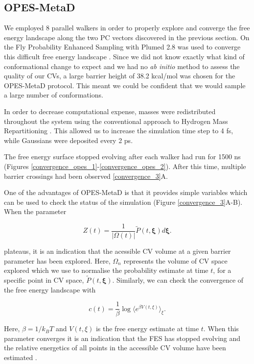 \subsection{OPES-MetaD}
We employed 8 parallel walkers in order to properly explore and converge the free energy landscape along the two PC vectors discovered in the previous section. On the Fly Probability Enhanced Sampling with Plumed 2.8 was used to converge this difficult free energy landscape \cite{invernizzi2020, tribello2014}. Since we did not know exactly what kind of conformational change to expect and we had no \textit {ab initio} method to assess the quality of our CVs, a large barrier height of 38.2 kcal/mol was chosen for the OPES-MetaD protocol. This meant we could be confident that we would sample a large number of conformations. 

In order to decrease computational expense, masses were redistributed throughout the system using the conventional approach to Hydrogen Mass Repartitioning \cite{hopkins2015, balusek2019}. This allowed us to increase the simulation time step to 4 fs, while Gaussians were deposited every 2 ps.

The free energy surface stopped evolving after each walker had run for 1500 ns (Figures \ref{convergence_opes_1}-\ref{convergence_opes_2}). After this time, multiple barrier crossings had been observed \ref{convergence_3}A.

One of the advantages of OPES-MetaD is that it provides simple variables which can be used to check the status of the simulation (Figure \ref{convergence_3}A-B). When the parameter 


\begin{equation}
Z(t) = \frac{1}{| \Omega(t)|}  \tilde{P}(t, \mathbf{\xi}) d\mathbf{\xi}.
\end{equation} 

plateaus, it is an indication that the acessible CV volume at a given barrier parameter has been explored. Here, $\Omega_n$ represents the volume of CV space explored which we use to normalise the probability estimate at time $t$, for a specific point in CV space, $\tilde{P}(t, \mathbf{\xi})$. Similarly, we can check the convergence of the free energy landscape with 

\begin{equation}
	c(t) = \frac{1}{\beta} \log \langle e^{\beta V(t,\xi)} \rangle_\xi.
\end{equation} 

Here, $\beta=1/k_BT$ and $V(t,\xi)$ is the free energy estimate at time $t$. When this parameter converges it is an indication that the FES has stopped evolving and the relative energetics of all points in the accessible CV volume have been estimated \cite{invernizzi2020, tiwary2015}. 

